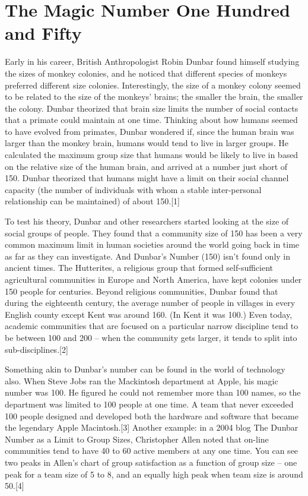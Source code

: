 \section*{The Magic Number One Hundred and Fifty}

Early in his career, British Anthropologist Robin Dunbar found himself studying the sizes of monkey colonies, and he noticed that different species of monkeys preferred different size colonies. Interestingly, the size of a monkey colony seemed to be related to the size of the monkeys’ brains; the smaller the brain, the smaller the colony. Dunbar theorized that brain size limits the number of social contacts that a primate could maintain at one time. Thinking about how humans seemed to have evolved from primates, Dunbar wondered if, since the human brain was larger than the monkey brain, humans would tend to live in larger groups. He calculated the maximum group size that humans would be likely to live in based on the relative size of the human brain, and arrived at a number just short of 150. Dunbar theorized that humans might have a limit on their social channel capacity (the number of individuals with whom a stable inter-personal relationship can be maintained) of about 150.[1]

To test his theory, Dunbar and other researchers started looking at the size of social groups of people. They found that a community size of 150 has been a very common maximum limit in human societies around the world going back in time as far as they can investigate. And Dunbar’s Number (150) isn’t found only in ancient times. The Hutterites, a religious group that formed self-sufficient agricultural communities in Europe and North America, have kept colonies under 150 people for centuries. Beyond religious communities, Dunbar found that during the eighteenth century, the average number of people in villages in every English county except Kent was around 160. (In Kent it was 100.) Even today, academic communities that are focused on a particular narrow discipline tend to be between 100 and 200 – when the community gets larger, it tends to split into sub-disciplines.[2]

Something akin to Dunbar’s number can be found in the world of technology also. When Steve Jobs ran the Mackintosh department at Apple, his magic number was 100. He figured he could not remember more than 100 names, so the department was limited to 100 people at one time. A team that never exceeded 100 people designed and developed both the hardware and software that became the legendary Apple Macintosh.[3] Another example: in a 2004 blog The Dunbar Number as a Limit to Group Sizes, Christopher Allen noted that on-line communities tend to have 40 to 60 active members at any one time. You can see two peaks in Allen’s chart of group satisfaction as a function of group size – one peak for a team size of 5 to 8, and an equally high peak when team size is around 50.[4]

